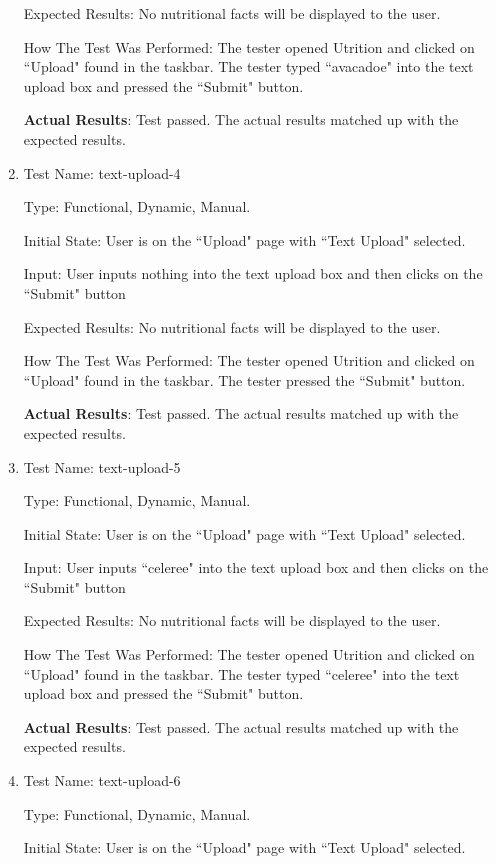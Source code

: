 \documentclass[12pt, titlepage]{article}
\begin{document}
\begin{enumerate}
		Expected Results: No nutritional facts will be displayed to the user.
		
		How The Test Was Performed: The tester opened Utrition and clicked on ``Upload" found in the taskbar. The tester typed ``avacadoe" into the text upload box and pressed the ``Submit" button.
		
		\textbf{Actual Results}: Test passed. The actual results matched up with the expected results.
		
		\item{Test Name: text-upload-4}
		
		Type: Functional, Dynamic, Manual.
		
		Initial State: User is on the ``Upload" page with ``Text Upload" selected.
		
		Input: User inputs nothing into the text upload box and then clicks on the ``Submit" button
		
		Expected Results: No nutritional facts will be displayed to the user.
		
		How The Test Was Performed: The tester opened Utrition and clicked on ``Upload" found in the taskbar. The tester pressed the ``Submit" button.
		
		\textbf{Actual Results}: Test passed. The actual results matched up with the expected results.
	
		\item{Test Name: text-upload-5}
		
		Type: Functional, Dynamic, Manual.
		
		Initial State: User is on the ``Upload" page with ``Text Upload" selected.
		
		Input: User inputs ``celeree" into the text upload box and then clicks on the ``Submit" button
		
		Expected Results: No nutritional facts will be displayed to the user.
		
		How The Test Was Performed: The tester opened Utrition and clicked on ``Upload" found in the taskbar. The tester typed ``celeree" into the text upload box and pressed the ``Submit" button.
		
		\textbf{Actual Results}: Test passed. The actual results matched up with the expected results.
		
		\item{Test Name: text-upload-6}
		
		Type: Functional, Dynamic, Manual.
		
		Initial State: User is on the ``Upload" page with ``Text Upload" selected.
		

\end{enumerate}
\end{document}
